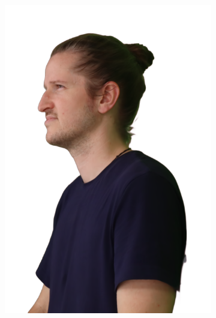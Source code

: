 \begin{figure}[!ht]
\begin{subfigure}{0.12\linewidth}
        \includegraphics[width=\textwidth]{Figures/results/initials/ephra/26_render.png}

\end{subfigure}
\end{figure}
